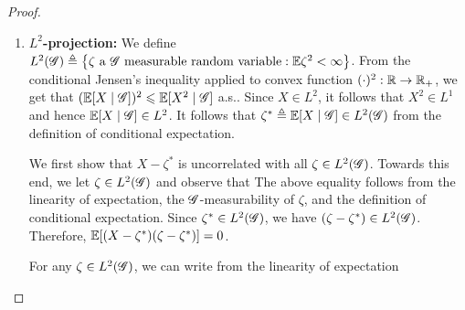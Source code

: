 \documentclass[letterpaper,10pt,english]{article}
\begin{document}
\begin{proof}
\begin{enumerate}
\item \textbf{$L^2$-projection:} 
We define $L^2(\sG) \triangleq \set{\zeta \text{ a } \sG \text{ measurable random variable}: 
\E\zeta^2 < \infty%
}$. 
From the conditional Jensen's inequality applied to convex function $(\cdot)^2:\mathbb{R} \to \mathbb{R}_+$, 
we get that $(\mathbb{E}[X\mid\mathscr{G}])^2 \leqslant \mathbb{E}[X^2\mid\mathscr{G}]$ a.s.. 
Since $X\in L^2$, it follows that $X^2\in L^1$ and hence $\mathbb{E}[X\mid\mathscr{G}] \in L^2$. 
It follows that $\zeta^\ast \triangleq \mathbb{E}[X\mid\mathscr{G}] \in L^2(\mathscr{G})$ from the definition of conditional expectation. 
 
We first show that $X - \zeta^\ast$ is uncorrelated with all $\zeta \in L^2(\mathscr{G})$. 
Towards this end, we let $\zeta\in L^2(\mathscr{G})$ and observe that 
The above equality follows from the linearity of expectation, 
the $\mathscr{G}$-measurability of $\zeta$,  
and the definition of conditional expectation. 
Since $\zeta^\ast\in L^2(\mathscr{G})$, we have $(\zeta-\zeta^\ast)\in L^2(\mathscr{G})$. 
Therefore, $\mathbb{E}[(X - \zeta^\ast)(\zeta-\zeta^\ast)] = 0$.  
 
For any $\zeta\in L^2(\mathscr{G})$, 
we can write from the linearity of expectation 


\end{enumerate}
\end{proof}


%
\end{document}
